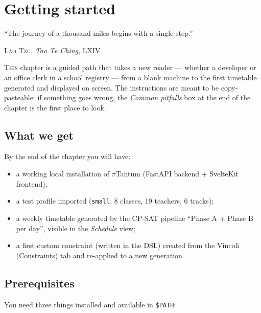 \chapter{Getting started}
\label{ch:getting_started}

\epigraph{``The journey of a thousand miles begins with a single
step.''}{\textsc{Lao Tzu}, \emph{Tao Te Ching}, LXIV}

\lettrine[lines=3]{T}{his} chapter is a guided path that takes a
new reader --- whether a developer or an office clerk in a school
registry --- from a blank machine to the first timetable generated
and displayed on screen. The instructions are meant to be
copy-pasteable: if something goes wrong, the \emph{Common
pitfalls} box at the end of the chapter is the first place to
look.


\section{What we get}

By the end of the chapter you will have:
\begin{itemize}
\item a working local installation of $\pi$Tantum (FastAPI
  backend + SvelteKit frontend);
\item a test profile imported (\texttt{small}: 8 classes,
  19 teachers, 6 tracks);
\item a weekly timetable generated by the CP-SAT pipeline
  ``Phase A + Phase B per day'', visible in the \emph{Schedule}
  view;
\item a first custom constraint (written in the DSL) created from
  the Vincoli (Constraints) tab and re-applied to a new
  generation.
\end{itemize}


\section{Prerequisites}

You need three things installed and available in \texttt{\$PATH}:

